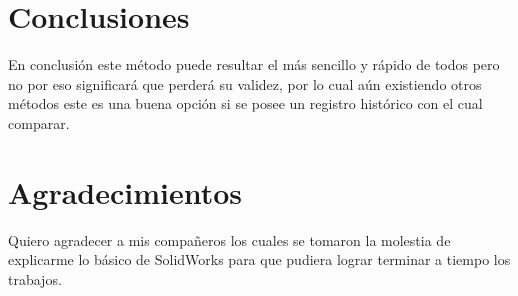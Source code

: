     \section{Conclusiones}
    
    En conclusión este método puede resultar el más sencillo y rápido de todos pero no por eso significará que perderá su validez, por lo cual aún existiendo otros métodos este es una buena opción si se posee un registro histórico con el cual comparar.
    
    \section{Agradecimientos}
    
    Quiero agradecer a mis compañeros los cuales se tomaron la molestia de explicarme lo básico de SolidWorks para que pudiera lograr terminar a tiempo los trabajos.
    
    
    
